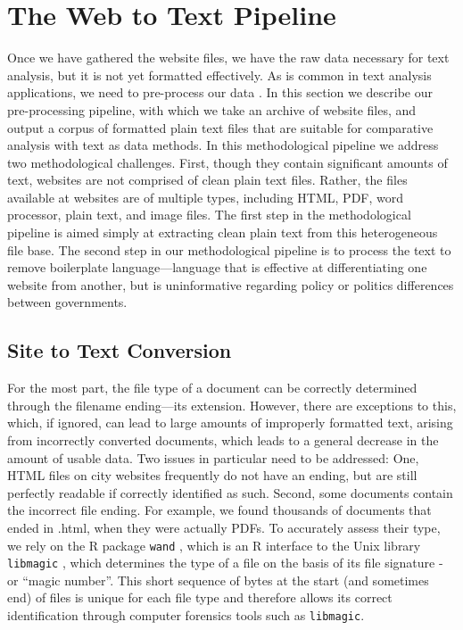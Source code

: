 \documentclass[11pt]{article}
\begin{document}
\section{The Web to Text Pipeline}

Once we have gathered the website files, we have the raw data necessary for text analysis, but it is not yet formatted effectively. As is common in text analysis applications, we need to pre-process our data \citep{denny2018text}. In this section we describe our pre-processing pipeline, with which we take an archive of website files, and output a corpus of formatted plain text files that are suitable for comparative analysis with text as data methods. In this methodological pipeline we address two methodological challenges. First, though they contain significant amounts of text, websites are not comprised of clean plain text files. Rather, the files available at websites are of multiple types, including HTML, PDF, word processor, plain text, and image files. The first step in the methodological pipeline is aimed simply at extracting clean plain text from this heterogeneous file base. The second step in our methodological pipeline is to process the text to remove boilerplate language---language that is effective at differentiating one website from another, but is uninformative regarding policy or politics differences between governments. 



\subsection{Site to Text Conversion}
For the most part, the file type of a document can be correctly determined through the filename ending---its extension. However, there are exceptions to this, which, if ignored, can lead to large amounts of improperly formatted text, arising from incorrectly converted documents, which leads to a general decrease in the amount of usable data. Two issues in particular need to be addressed: One, HTML files on city websites frequently do not have an ending, but are still perfectly readable if correctly identified as such. Second, some documents contain the incorrect file ending. For example, we found thousands of documents that ended in .html, when they were actually PDFs. To accurately assess their type, we rely on the R package \texttt{wand} \citep{wand}, which is an R interface to the Unix library \texttt{libmagic} \citep{darwin2008libmagic}, which determines the type of a file on the basis of its file signature - or ``magic number''. This short sequence of bytes at the start (and sometimes end) of files is unique for each file type and therefore allows its correct identification through computer forensics tools such as \texttt{libmagic}.
\end{document}
